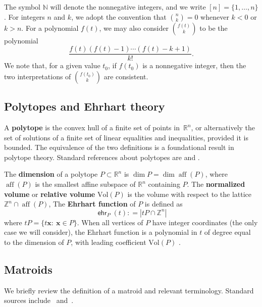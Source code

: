 \documentclass[11pt]{amsart}
\theoremstyle{definition}
\newcommand{\0}{\emptyset}
\newcommand{\R}{\mathbb{R}}
\newcommand{\Z}{\mathbb{Z}}
\newcommand{\N}{\mathbb{N}}
\newcommand{\Vol}{\mathrm{Vol}}
\DeclareMathOperator{\ehr}{\mathsf{ehr}}
\newcommand{\defterm}[1]{\textbf{#1}}
\begin{document}
The symbol $\N$ will denote the nonnegative integers, and we write $[n]=\{1,\dots,n\}$. For integers $n$ and $k$, we adopt the convention that $\binom{n}{k}=0$ whenever $k<0$ or $k>n$. For a polynomial $f(t)$, we may also consider $\binom{f(t)}{k}$ to be the polynomial
\[
\frac{f(t)(f(t)-1)\cdots (f(t)-k+1)}{k!}.
\]
We note that, for a given value $t_0$, if $f(t_0)$ is a nonnegative integer, then the two interpretations of $\binom{f(t_0)}{k}$ are consistent.

\subsection{Polytopes and Ehrhart theory}

A \defterm{polytope} is the convex hull of a finite set of points in~$\R^n$, or alternatively the set of solutions of a finite set of linear equalities and inequalities, provided it is bounded.
The equivalence of the two definitions is a foundational result in polytope theory.
Standard references about polytopes are \cite{Grunbaum} and \cite{Ziegler}.

The \defterm{dimension} of a polytope $P\subset\R^n$ is $\dim P=\dim \operatorname{aff}(P)$, where $\operatorname{aff}(P)$ is the smallest affine subspace of $\R^n$ containing $P$.
The \defterm{normalized volume} or \defterm{relative volume} $\Vol(P)$ is the volume with respect to the lattice $\Z^n\cap \operatorname{aff}(P)$, 
The \defterm{Ehrhart function} of $P$ is defined as
\[\ehr_P(t): = |tP\cap\Z^n|\] where $tP=\{t\mathbf{x}:\ \mathbf{x}\in P\}$.
When all vertices of $P$ have integer coordinates (the only case we will consider), the Ehrhart function is a polynomial in $t$ of degree equal to the dimension of $P$, with leading coefficient $\Vol(P)$ \cite{BeckRobins, Ehrhart}.

\subsection{Matroids}\label{subsec:matroids}
We briefly review the definition of a matroid and relevant terminology.  
Standard sources include~\cite{Oxley} and~\cite{Welsh}.
\end{document}
